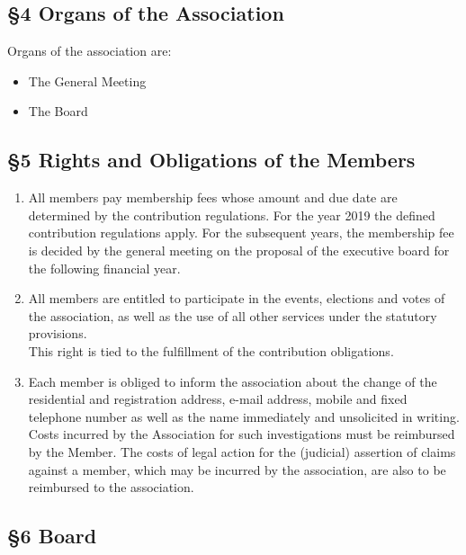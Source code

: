 \documentclass{article}
\begin{document}
\subsection{\S 4 Organs of the Association}

Organs of the association are: \\
\begin{itemize}
	\item The General Meeting
	\item The Board
\end{itemize}

\subsection{\S 5 Rights and Obligations of the Members}

\begin{enumerate}
	\item All members pay membership fees whose amount and due date are determined by the contribution regulations. 
	For the year 2019 the defined contribution regulations apply. 
	For the subsequent years, the membership fee is decided by the general meeting on the proposal of the executive board for the following financial year.
	\item All members are entitled to participate in the events, elections and votes of the association, as well as the use of all other services under the statutory provisions. \\
This right is tied to the fulfillment of the contribution obligations. 

	\item Each member is obliged to inform the association about the change of the residential and registration address, e-mail address, mobile and fixed telephone number as well as the name immediately and unsolicited in writing. 
	Costs incurred by the Association for such investigations must be reimbursed by the Member. 
	The costs of legal action for the (judicial) assertion of claims against a member, which may be incurred by the association, are also to be reimbursed to the association.
\end{enumerate}

\subsection{\S 6 Board}
\end{document}
